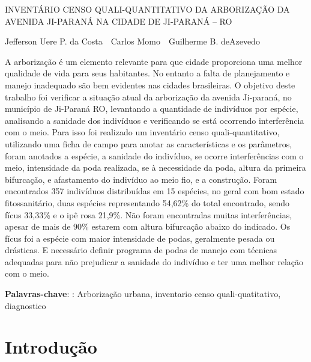 \documentclass[article,12pt,onesidea,4paper,english,brazil]{abntex2}
\begin{document}
	
	
	\frenchspacing 
	
	\begin{center}
		\LARGE INVENTÁRIO CENSO QUALI-QUANTITATIVO DA ARBORIZAÇÃO DA AVENIDA JI-PARANÁ NA CIDADE DE JI-PARANÁ -- RO
		
		\normalsize
	Jefferson Uere P. da Costa \,\,
	Carlos Momo \,\,
	Guilherme B. deAzevedo \,\,
	\end{center}
	
	\begin{resumoumacoluna}
		A arborização é um elemento relevante para que cidade proporciona uma melhor qualidade de vida para seus habitantes. No entanto a falta de planejamento e manejo inadequado são bem evidentes nas cidades brasileiras. O objetivo deste trabalho foi verificar a situação atual da arborização da avenida Ji-paraná, no município de Ji-Paraná RO, levantando a quantidade de indivíduos por espécie, analisando a sanidade dos indivíduos e verificando se está ocorrendo interferência com o meio. Para isso foi realizado um inventário censo quali-quantitativo, utilizando uma ficha de campo para anotar as características e os parâmetros, foram anotados a espécie, a sanidade do indivíduo, se ocorre interferências com o meio, intensidade da poda realizada, se à necessidade da poda, altura da primeira bifurcação, e afastamento do indivíduo ao meio fio, e a construção. Foram encontrados 357 indivíduos distribuídas em 15 espécies, no geral com bom estado fitossanitário, duas espécies representando 54,62\% do total encontrado, sendo fícus 33,33\% e o ipê rosa 21,9\%. Não foram encontradas muitas interferências, apesar de mais de 90\% estarem com altura bifurcação abaixo do indicado. Os fícus foi a espécie com maior intensidade de podas, geralmente pesada ou drásticas. E necessário definir programa de podas de manejo com técnicas adequadas para não prejudicar a sanidade do indivíduo e ter uma melhor relação com o meio.
		
		\vspace{\onelineskip}
		
		\noindent
		\textbf{Palavras-chave}: : Arborização urbana, inventario censo quali-quatitativo, diagnostico
	\end{resumoumacoluna}
	
	\section*{Introdução}
	
\end{document}
